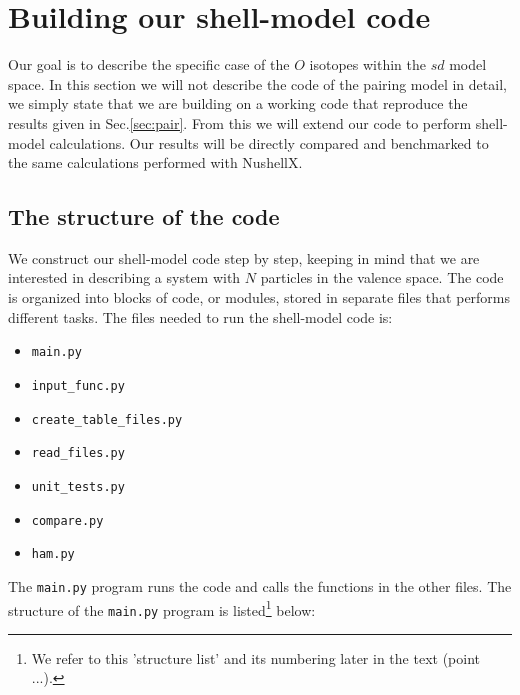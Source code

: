 \documentclass[twoside]{article}
\begin{document}


\section{Building our shell-model code}
\label{sec:ourcode}

Our goal is to describe the specific case of the $O$ isotopes within the $sd$ model space. In this section we will not describe the code of the pairing model in detail, we simply state that we are building on a working code that reproduce the results given in Sec.\ref{sec:pair}. From this we will extend our code to perform shell-model calculations. Our results will be directly compared and benchmarked to the same calculations performed with NushellX.

\subsection{The structure of the code}

We construct our shell-model code step by step, keeping in mind that we are interested in describing a system with $N$ particles in the valence space. The code is organized into blocks of code, or modules, stored in separate files that performs different tasks. The files needed to run the shell-model code is:
\begin{itemize}
\item \texttt{main.py}
\item \texttt{input\_func.py}
\item \texttt{create\_table\_files.py}
\item \texttt{read\_files.py}
\item \texttt{unit\_tests.py} 
\item \texttt{compare.py}
\item \texttt{ham.py} 
\end{itemize}
\smallskip

The \texttt{main.py} program runs the code and calls the functions in the other files. The structure of the \texttt{main.py} program is listed\footnote{We refer to this 'structure list' and its numbering later in the text (point ...).} below:
\end{document}
